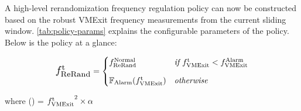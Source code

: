 


\begin{table}[t]
	\centering
	\footnotesize
	\renewcommand{\arraystretch}{.100}
	\setlength\tabcolsep{2pt}
	
	\caption{Configurable parameters to policy}
	\label{tab:policy-params}
\end{table}

\label{subsubsec:policy-formulation}
{A high-level rerandomization frequency regulation policy can now be constructed based on the robust VMExit frequency measurements from the current sliding window.}
\autoref{tab:policy-params} explains the configurable parameters of the policy.
Below is the policy at a glance:

{
\small
\begin{gather*}
	\scalebox{1.3}{\freqrrof{t}} =
	\begin{cases}
		\freqrrof{Normal}             & \textit{if }  \freqvmexitof{t} < \freqvmexitof{Alarm} \\[8pt]
		\rerandfunc(\freqvmexitof{t}) & \textit{otherwise}                                    %
	\end{cases}
\end{gather*}
\begin{center}
	\vspace{-0.5ex}
	where \rerandfunc() = ${f_{\text{VMExit}}^{\text{t}}}^2 \times \alpha$
\end{center}


}

